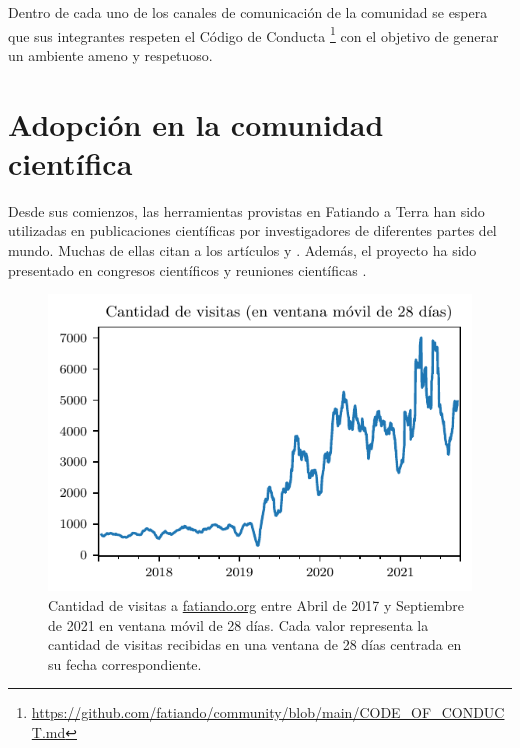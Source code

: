 Dentro de cada uno de los canales de comunicación de la comunidad se espera
que sus integrantes respeten el Código de
Conducta%
\footnote{%
    \url{https://github.com/fatiando/community/blob/main/CODE_OF_CONDUCT.md}%
}
con el objetivo de generar un ambiente ameno y respetuoso.



\section{Adopción en la comunidad científica}

Desde sus comienzos, las herramientas provistas en Fatiando a Terra han sido
utilizadas en publicaciones científicas por investigadores de diferentes partes
del mundo.
Muchas de ellas citan a los artículos \citet{uieda2013} y \citet{verde2018}.
Además, el proyecto ha sido presentado en congresos científicos y reuniones
científicas \citep{uieda2013,uieda2020b,soler2021c}.

\begin{figure}
    \centering
    \includegraphics[width=0.7\linewidth]{figs/fatiando/users_history.pdf}
    \caption{
        Cantidad de visitas a \href{https://fatiando.org}{fatiando.org} entre
        Abril de 2017 y Septiembre de 2021 en ventana móvil de 28 días.
        Cada valor representa la cantidad de visitas recibidas en una ventana
        de 28 días centrada en su fecha correspondiente.
    }
    \label{fig:fatiando-users-history}
\end{figure}

